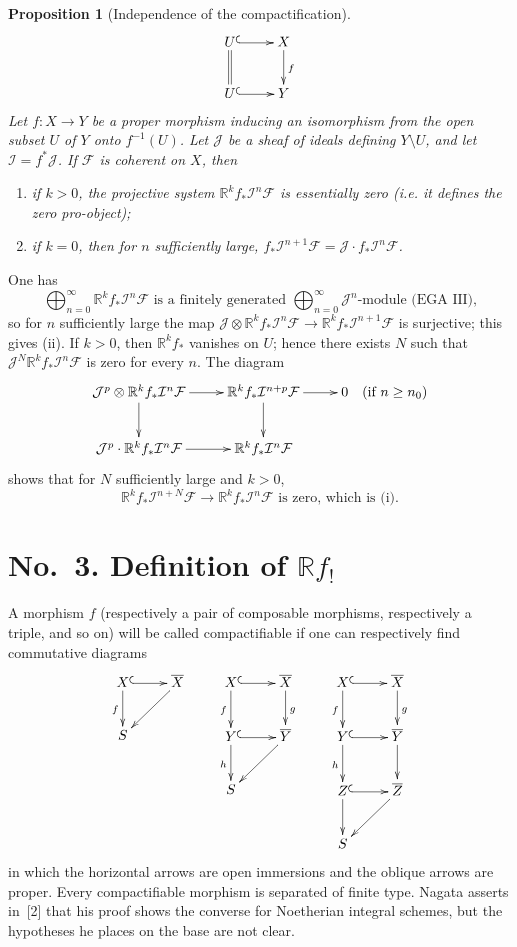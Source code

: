\documentclass[11pt]{amsart}
\newcommand{\cF}{\mathcal{F}}
\newcommand{\cI}{\mathcal{I}}
\newcommand{\cJ}{\mathcal{J}}
\newcommand{\bR}{\mathbb{R}}
\theoremstyle{plain}
\newtheorem{prop}{Proposition}
\theoremstyle{definition}
\begin{document}
\begin{prop}[Independence of the compactification]
\[
\xymatrix{
U \ar@{^{(}->}[r] \ar@{=}[d] & X \ar[d]^f \\
U \ar@{^{(}->}[r] & Y
}
\]
Let $f\colon X\to Y$ be a proper morphism inducing an isomorphism from the open subset $U$ of $Y$ onto $f^{-1}(U)$. Let $\cJ$ be a sheaf of ideals defining $Y\setminus U$, and let $\cI=f^*\cJ$. If $\cF$ is coherent on $X$, then
\begin{enumerate}
\item[(i)] if $k>0$, the projective system $\bR^k f_*\cI^n\cF$ is essentially zero (i.e. it defines the zero pro-object);
\item[(ii)] if $k=0$, then for $n$ sufficiently large, $f_*\cI^{n+1}\cF=\cJ\cdot f_*\cI^n\cF$.
\end{enumerate}
\end{prop}

One has
\[
\bigoplus_{n=0}^{\infty} \bR^k f_*\cI^n\cF\text{ is a finitely generated }\bigoplus_{n=0}^{\infty}\cJ^n\text{-module (EGA III),}
\]
so for $n$ sufficiently large the map $\cJ\otimes \bR^k f_*\cI^n\cF\to \bR^k f_*\cI^{n+1}\cF$ is surjective; this gives (ii). If $k>0$, then $\bR^k f_*$ vanishes on $U$; hence there exists $N$ such that $\cJ^N\bR^k f_*\cI^n\cF$ is zero for every $n$. The diagram
\[
\xymatrix{
\cJ^p \otimes \bR^k f_*\cI^n\cF \ar[r] \ar[d] & \bR^k f_*\cI^{n+p}\cF \ar[r] \ar[d] & 0 \quad (\text{if } n \ge n_0) \\
\cJ^p \cdot \bR^k f_*\cI^n\cF \ar[r] & \bR^k f_*\cI^n\cF
}
\]
shows that for $N$ sufficiently large and $k>0$,
\[
\bR^k f_*\cI^{n+N}\cF \to \bR^k f_*\cI^n\cF\text{ is zero, which is (i).}
\]

\section*{No.~3. Definition of $\bR f_!$}

A morphism $f$ (respectively a pair of composable morphisms, respectively a triple, and so on) will be called compactifiable if one can respectively find commutative diagrams
\[
\xymatrix{
X \ar@{^{(}->}[r] \ar[d]_f & \overline{X} \ar[dl] \\
S &
}
\qquad
\xymatrix{
X \ar@{^{(}->}[r] \ar[d]_f & \overline{X} \ar[d]^g \\
Y \ar@{^{(}->}[r] \ar[d]_h & \overline{Y} \ar[dl] \\
S &
}
\qquad
\xymatrix{
X \ar@{^{(}->}[r] \ar[d]_f & \overline{X} \ar[d]^g \\
Y \ar@{^{(}->}[r] \ar[d]_h & \overline{Y} \ar[d] \\
Z \ar@{^{(}->}[r] \ar[d] & \overline{Z} \ar[dl] \\
S &
}
\]
in which the horizontal arrows are open immersions and the oblique arrows are proper. Every compactifiable morphism is separated of finite type. Nagata asserts in~[2] that his proof shows the converse for Noetherian integral schemes, but the hypotheses he places on the base are not clear.
\end{document}
